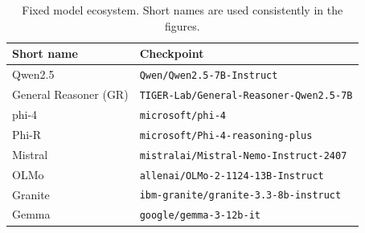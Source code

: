 \begin{table}[ht]
\caption{Fixed model ecosystem. Short names are used consistently in the figures.}
\label{tab:models}\centering\small
\begin{tabularx}{\linewidth}{lX}
\toprule
Short name & Checkpoint\\
\midrule
Qwen2.5 & \texttt{Qwen/Qwen2.5-7B-Instruct}\\
General Reasoner (GR) & \texttt{TIGER-Lab/General-Reasoner-Qwen2.5-7B}\\
phi-4 & \texttt{microsoft/phi-4}\\
Phi-R & \texttt{microsoft/Phi-4-reasoning-plus}\\
Mistral & \texttt{mistralai/Mistral-Nemo-Instruct-2407}\\
OLMo & \texttt{allenai/OLMo-2-1124-13B-Instruct}\\
Granite & \texttt{ibm-granite/granite-3.3-8b-instruct}\\
Gemma & \texttt{google/gemma-3-12b-it}\\
\bottomrule
\end{tabularx}
\end{table}
